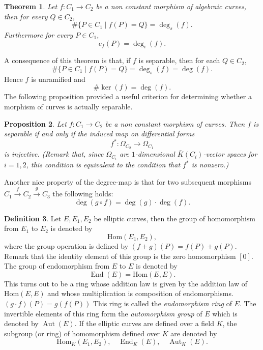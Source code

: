 \documentclass{article}
\numberwithin{equation}{section}
\newtheorem{theorem}{Theorem}[subsection]
\newtheorem{proposition}[theorem]{Proposition}
\theoremstyle{definition}
\newtheorem{definition}[theorem]{Definition}
\newcommand{\degree}[1]{\operatorname{deg} \left(#1\right)} %
\newcommand{\idegree}[1]{\operatorname{deg}_i \left(#1\right)} %
\newcommand{\sdegree}[1]{\operatorname{deg}_s \left(#1\right)} %
\newcommand{\kernel}[1]{\operatorname{ker} \left(#1\right)} %
\newcommand{\Endring}[1]{\operatorname{End} (#1)} %
\newcommand{\Endringk}[2]{\operatorname{End}_{#2} (#1)} %
\newcommand{\Autgrp}[1]{\operatorname{Aut} (#1)} %
\newcommand{\Autgrpk}[2]{\operatorname{Aut}_{#2} (#1)} %
\begin{document}
\begin{theorem}\label{degreetheorem}
Let $f: C_1 \rightarrow C_2$ be a non constant morphism of algebraic curves, then for every $Q \in C_2$, $$\#\{P \in C_1 \; | \; f(P)=Q\}=\sdegree{f}.$$ Furthermore for every $P \in C_1$, $$e_f(P)=\idegree{f}.$$
\end{theorem}

A consequence of this theorem is that, if $f$ is separable, then for each $Q \in C_2$, $$\#\{P \in C_1 \; | \; f(P)=Q\} = \sdegree{f} = \degree{f}.$$ Hence $f$ is unramified and \begin{equation}\label{kernelisdegree}\#\kernel{f} = \degree{f}.\end{equation} The following proposition provided a useful criterion for determining whether a morphism of curves is actually separable.

\begin{proposition}\label{separablecrit}
Let $f:C_1 \rightarrow C_2$ be a non constant morphism of curves. Then $f$ is separable if and only if the induced map on differential forms $$f^*:\Omega_{C_2} \rightarrow \Omega_{C_1}$$ is injective. (Remark that, since $\Omega_{C_i}$ are $1$-dimensional $\bar{K}(C_i)$-vector spaces for $i=1,2$, this condition is equivalent to the condition that $f^*$ is nonzero.)
\end{proposition}

Another nice property of the degree-map is that for two subsequent morphisms $C_1 \overset{f}{\rightarrow} C_2 \overset{g}{\rightarrow} C_3$ the following holds: \begin{equation}\label{degreeconcatenation}\degree{g \circ f}=\degree{g} \cdot \degree{f}.\end{equation}

\begin{definition}
Let $E,E_1,E_2$ be elliptic curves, then the group of homomorphism from $E_1$ to $E_2$ is denoted by $$\text{Hom}(E_1,E_2),$$ where the group operation is defined by $(f+g) (P) = f(P) + g(P)$. Remark that the identity element of this group is the zero homomorphism $[0]$. The group of endomorphism from $E$ to $E$ is denoted by $$\Endring{E} = \text{Hom}(E,E).$$ This turns out to be a ring whose addition law is given by the addition law of $\text{Hom}(E,E)$ and whose multiplication is composition of endomorphisms. $(g\cdot f)(P)=g(f(P))$ This ring is called the \emph{endomorphism ring} of $E$. The invertible elements of this ring form the \emph{automorphism group} of $E$ which is denoted by $\Autgrp{E}.$ If the elliptic curves are defined over a field $K$, the subgroup (or ring) of homomorphism defined over $K$ are denoted by $$\text{Hom}_K(E_1,E_2),\quad \Endringk{E}{K},\quad \Autgrpk{E}{K}.$$ 
\end{definition}
\end{document}
